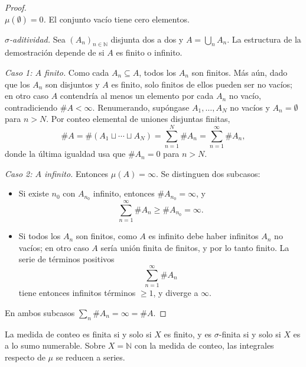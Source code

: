 \documentclass[11pt, a4paper]{article}
\begin{document}
\begin{proof}\leavevmode\\
\textit{$\mu(\emptyset) = 0$.} El conjunto vacío tiene cero elementos.

\textit{$\sigma$-aditividad.} Sea $(A_n)_{n \in \mathbb{N}}$ disjunta dos a dos y
$A = \bigcup_n A_n$. La estructura de la demostración depende de si $A$ es finito o infinito.

\textit{Caso 1: $A$ finito.} Como cada $A_n \subseteq A$, todos los $A_n$ son finitos. Más
aún, dado que los $A_n$ son disjuntos y $A$ es finito, solo finitos de ellos pueden ser no
vacíos; en otro caso $A$ contendría al menos un elemento por cada $A_n$ no vacío,
contradiciendo $\#A < \infty$. Renumerando, supóngase $A_1, \dots, A_N$ no vacíos y $A_n =
\emptyset$ para $n > N$. Por conteo elemental de uniones disjuntas finitas,
$$ \#A = \#(A_1 \sqcup \cdots \sqcup A_N) = \sum_{n=1}^{N} \#A_n = \sum_{n=1}^{\infty} \#A_n, $$
donde la última igualdad usa que $\#A_n = 0$ para $n > N$.

\textit{Caso 2: $A$ infinito.} Entonces $\mu(A) = \infty$. Se distinguen dos subcasos:
\begin{itemize}
    \item Si existe $n_0$ con $A_{n_0}$ infinito, entonces $\#A_{n_0} = \infty$, y
    $$ \sum_{n=1}^{\infty} \#A_n \ge \#A_{n_0} = \infty. $$
    \item Si todos los $A_n$ son finitos, como $A$ es infinito debe haber infinitos $A_n$ no
    vacíos; en otro caso $A$ sería unión finita de finitos, y por lo tanto finito. La serie
    de términos positivos
    $$ \sum_{n=1}^{\infty} \#A_n $$
    tiene entonces infinitos términos $\ge 1$, y diverge a $\infty$.
\end{itemize}
En ambos subcasos $\sum_n \#A_n = \infty = \#A$.
\end{proof}

\obs La medida de conteo es finita si y solo si $X$ es finito, y es $\sigma$-finita si y solo si
$X$ es a lo sumo numerable. Sobre $X = \mathbb{N}$ con la medida de conteo, las integrales
respecto de $\mu$ se reducen a series.
\end{document}
